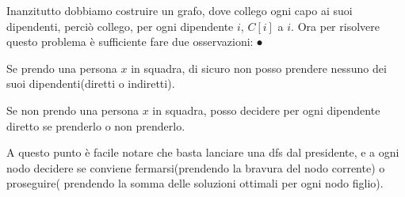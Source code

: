 
Inanzitutto dobbiamo costruire un grafo, dove collego ogni capo ai suoi dipendenti, perciò collego, per ogni dipendente $i$,  $C[i]$ a $i$. \itemize
Ora per risolvere questo problema è sufficiente fare due osservazioni:\itemize \newline
⦁
\item Se prendo una persona $x$ in squadra, di sicuro non posso prendere nessuno dei suoi dipendenti(diretti o indiretti).\newline

\item Se non prendo una persona $x$ in squadra, posso decidere per ogni dipendente diretto se  prenderlo o non prenderlo.\newline

A questo punto è facile notare che basta lanciare una dfs dal presidente, e a ogni nodo decidere se conviene fermarsi(prendendo la bravura del nodo corrente) o proseguire( prendendo la somma delle soluzioni ottimali per ogni nodo figlio).\itemize
\newline

\colorbox{white}{} 
